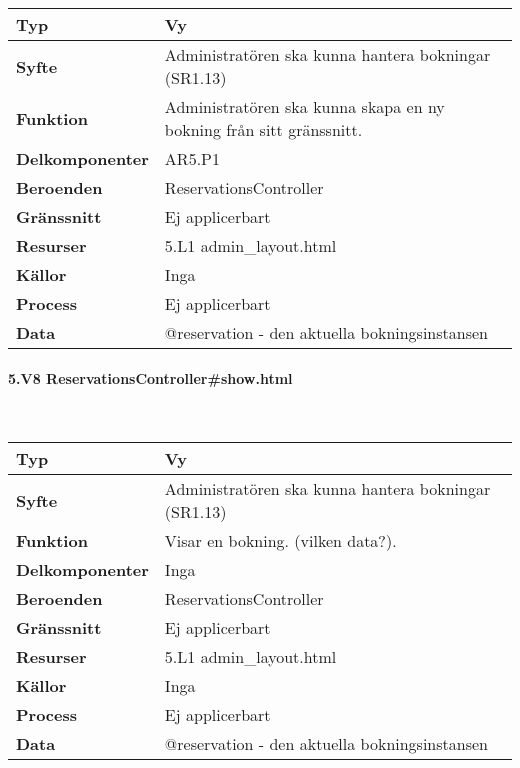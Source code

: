 \documentclass[a4paper, twoside, 11pt, titlepage]{article}
\begin{document}
			\begin {table} [ht] \begin{tabular} {  p{3.5cm} p{11.6cm} }
				\hline
				{\sffamily\textbf{Typ}} & {Vy} \\
				\hline
				{\sffamily\textbf{Syfte}} & {Administratören ska kunna hantera bokningar (SR1.13)} \\
				\hline
				{\sffamily\textbf{Funktion}} & {Administratören ska kunna skapa en ny bokning från sitt gränssnitt.} \\
				\hline
				{\sffamily\textbf{Delkomponenter}} & {AR5.P1} \\
				\hline
				{\sffamily\textbf{Beroenden}} & {ReservationsController} \\
				\hline
				{\sffamily\textbf{Gränssnitt}} & {Ej applicerbart} \\
				\hline
				{\sffamily\textbf{Resurser}} & {5.L1 admin\_layout.html} \\
				\hline
				{\sffamily\textbf{Källor}} & {Inga} \\
				\hline
				{\sffamily\textbf{Process}} & {Ej applicerbart} \\
				\hline
				{\sffamily\textbf{Data}} & {@reservation - den aktuella bokningsinstansen} \\
				\hline
			\end{tabular} \end{table} \FloatBarrier


			\clearpage %
			\paragraph{5.V8 ReservationsController\#show.html}\

			\begin {table} [ht] \begin{tabular} {  p{3.5cm} p{11.6cm} }
				\hline
				{\sffamily\textbf{Typ}} & {Vy} \\
				\hline
				{\sffamily\textbf{Syfte}} & {Administratören ska kunna hantera bokningar (SR1.13)} \\
				\hline
				{\sffamily\textbf{Funktion}} & {Visar en bokning. (vilken data?).} \\
				\hline
				{\sffamily\textbf{Delkomponenter}} & {Inga} \\
				\hline
				{\sffamily\textbf{Beroenden}} & {ReservationsController} \\
				\hline
				{\sffamily\textbf{Gränssnitt}} & {Ej applicerbart} \\
				\hline
				{\sffamily\textbf{Resurser}} & {5.L1 admin\_layout.html} \\
				\hline
				{\sffamily\textbf{Källor}} & {Inga} \\
				\hline
				{\sffamily\textbf{Process}} & {Ej applicerbart} \\
				\hline
				{\sffamily\textbf{Data}} & {@reservation - den aktuella bokningsinstansen} \\
				\hline
			\end{tabular} \end{table} \FloatBarrier
\end{document}

